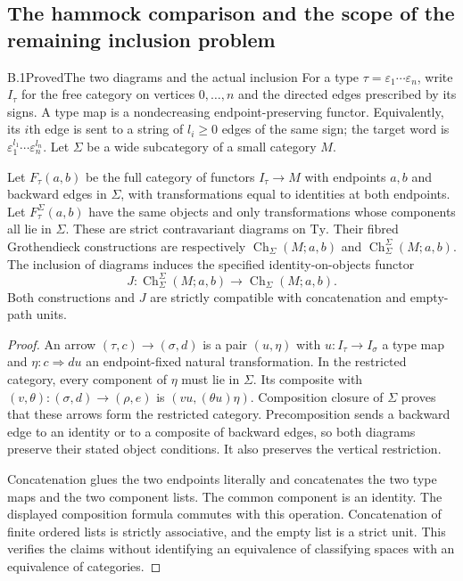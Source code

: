 \subsection{The hammock comparison and the scope of the remaining inclusion problem}

\begin{result}{B.1}{Proved}{The two diagrams and the actual inclusion}
For a type $\tau=\varepsilon_1\cdots\varepsilon_n$, write $I_\tau$ for the free category on vertices $0,\ldots,n$ and the directed edges prescribed by its signs. A type map is a nondecreasing endpoint-preserving functor. Equivalently, its $i$th edge is sent to a string of $l_i\geq0$ edges of the same sign; the target word is $\varepsilon_1^{l_1}\cdots\varepsilon_n^{l_n}$. Let $\Sigma$ be a wide subcategory of a small category $M$.

Let $F_\tau(a,b)$ be the full category of functors $I_\tau\to M$ with endpoints $a,b$ and backward edges in $\Sigma$, with transformations equal to identities at both endpoints. Let $F_\tau^\Sigma(a,b)$ have the same objects and only transformations whose components all lie in $\Sigma$. These are strict contravariant diagrams on $\mathrm{Ty}$. Their fibred Grothendieck constructions are respectively
$\operatorname{Ch}_\Sigma(M;a,b)$ and
$\operatorname{Ch}_\Sigma^\Sigma(M;a,b)$.
The inclusion of diagrams induces the specified identity-on-objects functor
\[
 J:\operatorname{Ch}_\Sigma^\Sigma(M;a,b)
       \longrightarrow\operatorname{Ch}_\Sigma(M;a,b).
\]
Both constructions and $J$ are strictly compatible with concatenation and empty-path units.
\end{result}
\begin{proof}
An arrow $(\tau,c)\to(\sigma,d)$ is a pair $(u,\eta)$ with
$u:I_\tau\to I_\sigma$ a type map and
$\eta:c\Rightarrow d u$ an endpoint-fixed natural transformation. In the restricted category, every component of $\eta$ must lie in $\Sigma$. Its composite with $(v,\theta):(\sigma,d)\to(\rho,e)$ is
$(vu,(\theta u)\eta)$.
Composition closure of $\Sigma$ proves that these arrows form the restricted category. Precomposition sends a backward edge to an identity or to a composite of backward edges, so both diagrams preserve their stated object conditions. It also preserves the vertical restriction.

Concatenation glues the two endpoints literally and concatenates the two type maps and the two component lists. The common component is an identity. The displayed composition formula commutes with this operation. Concatenation of finite ordered lists is strictly associative, and the empty list is a strict unit. This verifies the claims without identifying an equivalence of classifying spaces with an equivalence of categories.
\end{proof}

